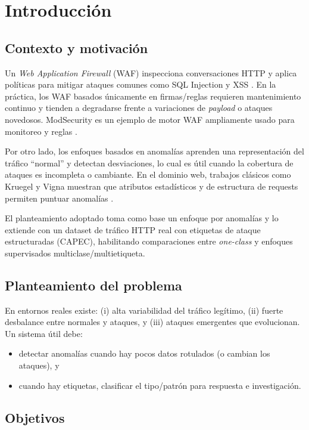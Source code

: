\documentclass[12pt,oneside]{report}
\begin{document}
\chapter{Introducción}

\section{Contexto y motivación}
Un \textit{Web Application Firewall} (WAF) inspecciona conversaciones HTTP y aplica políticas para mitigar ataques comunes
como SQL Injection y XSS \cite{owasp_waf}. En la práctica, los WAF basados únicamente en firmas/reglas requieren mantenimiento continuo
y tienden a degradarse frente a variaciones de \textit{payload} o ataques novedosos. ModSecurity es un ejemplo de motor WAF ampliamente usado
para monitoreo y reglas \cite{modsecurity_site}.

Por otro lado, los enfoques basados en anomalías aprenden una representación del tráfico ``normal'' y detectan desviaciones,
lo cual es útil cuando la cobertura de ataques es incompleta o cambiante. En el dominio web, trabajos clásicos como Kruegel y Vigna
muestran que atributos estadísticos y de estructura de requests permiten puntuar anomalías \cite{kruegel_vigna_2003}.

El planteamiento adoptado toma como base un enfoque por anomalías y lo extiende con un dataset de tráfico HTTP real con etiquetas de ataque
estructuradas (CAPEC), habilitando comparaciones entre \textit{one-class} y enfoques supervisados multiclase/multietiqueta.

\section{Planteamiento del problema}
En entornos reales existe: (i) alta variabilidad del tráfico legítimo, (ii) fuerte desbalance entre normales y ataques,
y (iii) ataques emergentes que evolucionan. Un sistema útil debe:
\begin{itemize}[leftmargin=*]
  \item detectar anomalías cuando hay pocos datos rotulados (o cambian los ataques), y
  \item cuando hay etiquetas, clasificar el tipo/patrón para respuesta e investigación.
\end{itemize}

\section{Objetivos}
\end{document}
